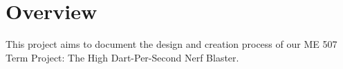 \chapter{Overview}
\hypertarget{md_main}{}\label{md_main}
\label{md_main_autotoc_md0}%
%
 This project aims to document the design and creation process of our ME 507 Term Project\+: The High Dart-\/\+Per-\/\+Second Nerf Blaster.

 